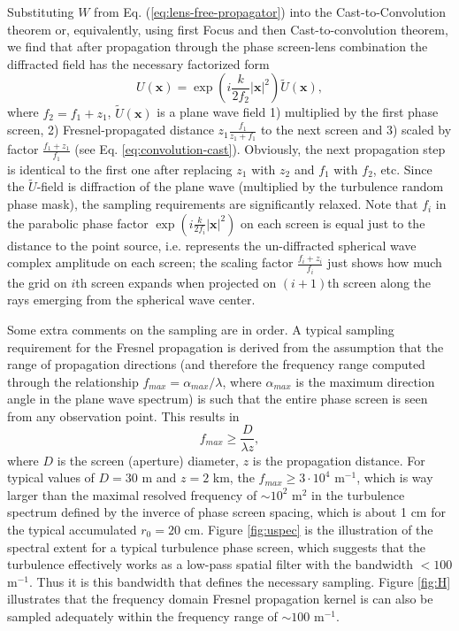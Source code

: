 Substituting $W$ from Eq. (\ref{eq:lens-free-propagator}) into the
Cast-to-Convolution theorem or, equivalently, using first Focus and then
Cast-to-convolution theorem, we find that after propagation through the phase
screen-lens combination the diffracted field has the necessary factorized form
\begin{equation} \label{eq:factorized-field}
  U(\bm{x}) = \exp (i\frac{k}{2 f_{2}} |\bm{x}|^{2}) \tilde{U} (\bm{x}),
\end{equation}
where $f_{2} = f_{1}+z_{1}$, $\tilde{U} (\bm{x})$ is a plane wave field 1)
multiplied by the first phase screen, 2) Fresnel-propagated distance $z_{1}
\frac{f_{1}}{z_{1}+f_{1}}$ to the next screen and 3) scaled by
factor $\frac{f_{1}+z_{1}}{f_{{1}}}$ (see Eq.
\ref{eq:convolution-cast}). Obviously, the next propagation step is
identical to the first one after replacing $z_{1}$ with $z_{2}$ and $f_{1}$
with $f_{2}$, etc. Since the $\tilde{U}$-field is diffraction
of the plane wave (multiplied by the turbulence random phase mask), the
sampling requirements are significantly relaxed. Note that $f_{i}$ in the
parabolic phase
factor $\exp (i\frac{k}{2f_{i}} |\bm{x}|^{2})$ on each screen is equal just to
the distance
to the point source, i.e. represents the un-diffracted spherical wave complex
amplitude on each
screen; the scaling factor $\frac{f_{i}+z_{i}}{f_{i}}$ just shows how much the
grid on $i$th screen expands when projected on $(i+1)$th screen along the rays
emerging from the spherical wave center.

Some extra comments on the sampling are in order. A typical sampling
requirement for the Fresnel propagation \cite{SchmidtProp} is derived from the
assumption that the range of propagation directions (and therefore the
frequency range computed through the relationship $f_{max} =
\alpha_{max}/\lambda$, where $\alpha_{max}$ is the maximum
direction angle in the plane wave spectrum) is such that the entire phase
screen is seen from any observation point. This results in
\begin{equation} \label{eq:classical-Fresnel-sampling}
  f_{max} \geq \frac{D}{\lambda z},
\end{equation}
where $D$ is the screen (aperture) diameter, $z$ is the propagation distance.
For typical values of $D = 30$ m and $z = 2$ km, the $f_{max} \geq 3 \cdot
10^{4}$ m$^{-1}$, which is way larger than the maximal resolved frequency of
$\sim 10^{2}$ m$^{2}$ in the turbulence spectrum defined by the inverce of
phase screen spacing, which is about 1 cm for the typical accumulated $r_{0} =
20$ cm. Figure \ref{fig:uspec} is the illustration of the spectral extent for
a typical turbulence phase screen, which suggests that the turbulence
effectively works as a low-pass spatial filter with the bandwidth $< 100$
m$^{-1}$. Thus it is this bandwidth that defines the necessary sampling. Figure
\ref{fig:H} illustrates that the frequency domain Fresnel propagation
kernel is can also be sampled adequately within the frequency range of $\sim
100$ m$^{-1}$.

